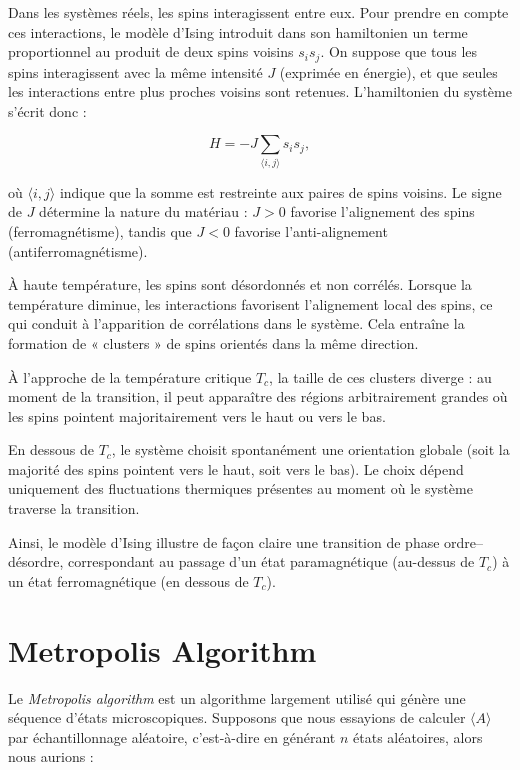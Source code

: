 \documentclass[a4paper,11pt]{article}
\begin{document}
Dans les systèmes réels, les spins interagissent entre eux. Pour prendre en compte ces interactions, le modèle d’Ising introduit dans son hamiltonien un terme proportionnel au produit de deux spins voisins $s_i s_j$. On suppose que tous les spins interagissent avec la même intensité $J$ (exprimée en énergie), et que seules les interactions entre plus proches voisins sont retenues. L’hamiltonien du système s’écrit donc :  

\begin{equation}
H = -J \sum_{\langle i,j \rangle} s_i s_j,
\end{equation}

où $\langle i,j \rangle$ indique que la somme est restreinte aux paires de spins voisins.  
Le signe de $J$ détermine la nature du matériau : $J > 0$ favorise l’alignement des spins (ferromagnétisme), tandis que $J < 0$ favorise l’anti-alignement (antiferromagnétisme).  

À haute température, les spins sont désordonnés et non corrélés. Lorsque la température diminue, les interactions favorisent l’alignement local des spins, ce qui conduit à l’apparition de corrélations dans le système. Cela entraîne la formation de « clusters » de spins orientés dans la même direction.  

À l’approche de la température critique $T_c$, la taille de ces clusters diverge : au moment de la transition, il peut apparaître des régions arbitrairement grandes où les spins pointent majoritairement vers le haut ou vers le bas.  

En dessous de $T_c$, le système choisit spontanément une orientation globale (soit la majorité des spins pointent vers le haut, soit vers le bas). Le choix dépend uniquement des fluctuations thermiques présentes au moment où le système traverse la transition.  

Ainsi, le modèle d’Ising illustre de façon claire une transition de phase ordre–désordre, correspondant au passage d’un état paramagnétique (au-dessus de $T_c$) à un état ferromagnétique (en dessous de $T_c$).

\section{Metropolis Algorithm}

Le \emph{Metropolis algorithm} est un algorithme largement utilisé qui génère une séquence d’états microscopiques.  
Supposons que nous essayions de calculer $\langle A \rangle$ par échantillonnage aléatoire, c’est-à-dire en générant $n$ états aléatoires, alors nous aurions :  
\end{document}

